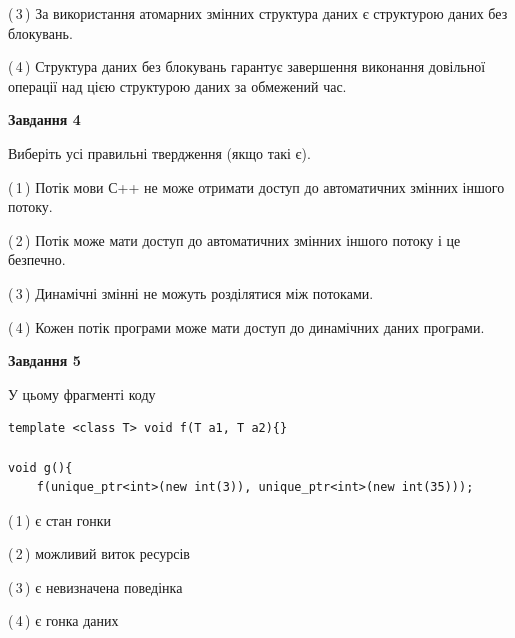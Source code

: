 \documentclass[12pt, ukrainian]{article}
\begin{document}
\begin {large}
{(\,3\,) За використання атомарних змінних структура даних є структурою даних без блокувань.%

(\,4\,) Структура даних без блокувань гарантує завершення виконання довільної операції над цією структурою даних за обмежений час.%



\begin{center}
\textbf{Завдання 4}
\end{center}
Виберіть усі правильні твердження (якщо такі є).\par
\vspace{2mm}

(\,1\,) Потік мови С++ не може отримати доступ до автоматичних змінних іншого потоку.%

(\,2\,) Потік може мати доступ до автоматичних змінних іншого потоку і це безпечно.%

(\,3\,) Динамічні змінні не можуть розділятися між потоками.%

(\,4\,) Кожен потік програми може мати доступ до динамічних даних програми.%



\begin{center}
\textbf{Завдання 5}
\end{center}
У цьому фрагменті коду
\begin{verbatim}
template <class T> void f(T a1, T a2){}

void g(){
    f(unique_ptr<int>(new int(3)), unique_ptr<int>(new int(35)));
\end{verbatim}

(\,1\,) є стан гонки%

(\,2\,) можливий виток ресурсів%

(\,3\,) є невизначена поведінка%

(\,4\,) є гонка даних%


}
\end {large}
\end{document}
